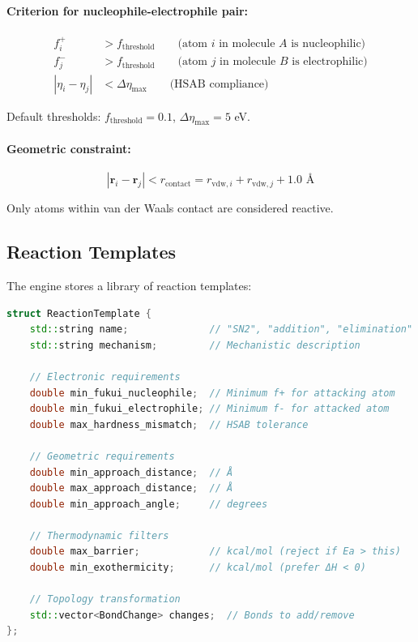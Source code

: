 \documentclass[11pt]{article}
\begin{document}
\paragraph{Criterion for nucleophile-electrophile pair:}
\begin{align}
f_i^+ &> f_{\text{threshold}} \qquad \text{(atom $i$ in molecule $A$ is nucleophilic)} \\
f_j^- &> f_{\text{threshold}} \qquad \text{(atom $j$ in molecule $B$ is electrophilic)} \\
|\eta_i - \eta_j| &< \Delta\eta_{\text{max}} \qquad \text{(HSAB compliance)}
\end{align}

Default thresholds: $f_{\text{threshold}} = 0.1$, $\Delta\eta_{\text{max}} = 5$ eV.

\paragraph{Geometric constraint:}
\begin{equation}
|\mathbf{r}_i - \mathbf{r}_j| < r_{\text{contact}} = r_{\text{vdw},i} + r_{\text{vdw},j} + 1.0 \text{ \AA}
\end{equation}

Only atoms within van der Waals contact are considered reactive.

\subsection{Reaction Templates}

The engine stores a library of reaction templates:

\begin{lstlisting}[language=C++]
struct ReactionTemplate {
    std::string name;              // "SN2", "addition", "elimination"
    std::string mechanism;         // Mechanistic description
    
    // Electronic requirements
    double min_fukui_nucleophile;  // Minimum f+ for attacking atom
    double min_fukui_electrophile; // Minimum f- for attacked atom
    double max_hardness_mismatch;  // HSAB tolerance
    
    // Geometric requirements
    double min_approach_distance;  // Å
    double max_approach_distance;  // Å
    double min_approach_angle;     // degrees
    
    // Thermodynamic filters
    double max_barrier;            // kcal/mol (reject if Ea > this)
    double min_exothermicity;      // kcal/mol (prefer ΔH < 0)
    
    // Topology transformation
    std::vector<BondChange> changes;  // Bonds to add/remove
};
\end{lstlisting}
\end{document}
